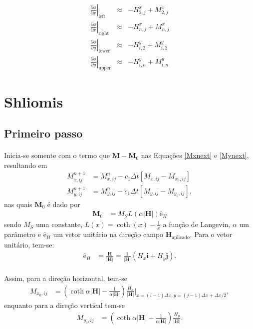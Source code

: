 \documentclass[eletromagnetismo.tex]{subfiles}
\begin{document}
\begin{eqnarray}
\left.\frac{\partial \phi}{\partial x}\right|_{\mathrm{left}}\;\;&\approx&- H^{x}_{2,j} + M^{x}_{2,j}\\
\left.\frac{\partial \phi}{\partial x}\right|_{\mathrm{right}}&\approx&- H^{x}_{n,j} + M^{x}_{n,j}\\
\left.\frac{\partial \phi}{\partial y}\right|_{\mathrm{lower}}&\approx&- H^{y}_{i,2} + M^{y}_{i,2}\\
\left.\frac{\partial \phi}{\partial y}\right|_{\mathrm{upper}}&\approx&- H^{y}_{i,n} + M^{y}_{i,n}
\end{eqnarray}

\section{Shliomis}
\subsection{Primeiro passo}
\paragraph{} Inicia-se somente com o termo que $\mathbf{M}-\mathbf{M}_0$ nas Equações \ref{Mxnext} e \ref{Mynext}, resultando em \begin{align}
M_{x,ij}^{n+1} & = M_{x,ij}^n -c_1\Delta t[M_{x,ij} - M_{x_0,ij}]\\
M_{y,ij}^{n+1} & = M_{y,ij}^n -c_1\Delta t[M_{y,ij} - M_{y_0,ij}], 
\end{align} nas quais $\mathbf{M}_0$ é dado por \begin{align}
	\mathbf{M}_0 & = M_S L(\alpha|\mathbf{H}|)\hat{\mathrm{e}}_H
\end{align} sendo $M_S$ uma constante, $L(x) = \coth(x) - \frac{1}{x}$ a função de Langevin, $\alpha$ um parâmetro e $\hat{\mathrm{e}}_H$ um vetor unitário na direção campo $\mathbf{H}_{\mathrm{aplicado}}$. Para o vetor unitário, tem-se: \begin{align}
	\hat{\mathrm{e}}_H & = \frac{\mathbf{H}}{|\mathbf{H}|} =  \frac{1}{|\mathbf{H}|}\left(H_x\mathbf{i} + H_y\mathbf{j}\right).
\end{align}

\paragraph{} Assim, para a direção horizontal, tem-se \begin{align}
M_{x_0,ij} & = \left(\coth{\alpha |\mathbf{H}|} - \frac{1}{\alpha |\mathbf{H}|}\right)\frac{H_{x}}{|\mathbf{H}|}\Bigg|_{x=(i-1)\Delta x, y=(j-1)\Delta x+\Delta x/2},
\end{align} enquanto para a direção vertical tem-se \begin{align}
M_{y_0,ij} & = \left(\coth{\alpha |\mathbf{H}|} - \frac{1}{\alpha |\mathbf{H}|}\right)\frac{H_{y}}{|\mathbf{H}|}.	
\end{align}
\end{document}
